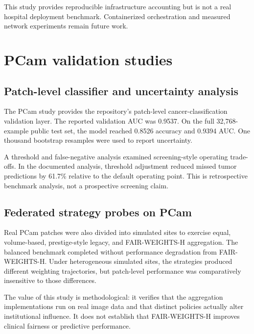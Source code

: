 This study provides reproducible infrastructure accounting but is not a real hospital deployment benchmark. Containerized orchestration and measured network experiments remain future work.

\section{PCam validation studies}

\subsection{Patch-level classifier and uncertainty analysis}
The PCam study provides the repository's patch-level cancer-classification validation layer. The reported validation AUC was 0.9537. On the full 32,768-example public test set, the model reached 0.8526 accuracy and 0.9394 AUC. One thousand bootstrap resamples were used to report uncertainty.

A threshold and false-negative analysis examined screening-style operating trade-offs. In the documented analysis, threshold adjustment reduced missed tumor predictions by 61.7\% relative to the default operating point. This is retrospective benchmark analysis, not a prospective screening claim.

\subsection{Federated strategy probes on PCam}
Real PCam patches were also divided into simulated sites to exercise equal, volume-based, prestige-style legacy, and FAIR-WEIGHTS-H aggregation. The balanced benchmark completed without performance degradation from FAIR-WEIGHTS-H. Under heterogeneous simulated sites, the strategies produced different weighting trajectories, but patch-level performance was comparatively insensitive to those differences.

The value of this study is methodological: it verifies that the aggregation implementations run on real image data and that distinct policies actually alter institutional influence. It does not establish that FAIR-WEIGHTS-H improves clinical fairness or predictive performance.

